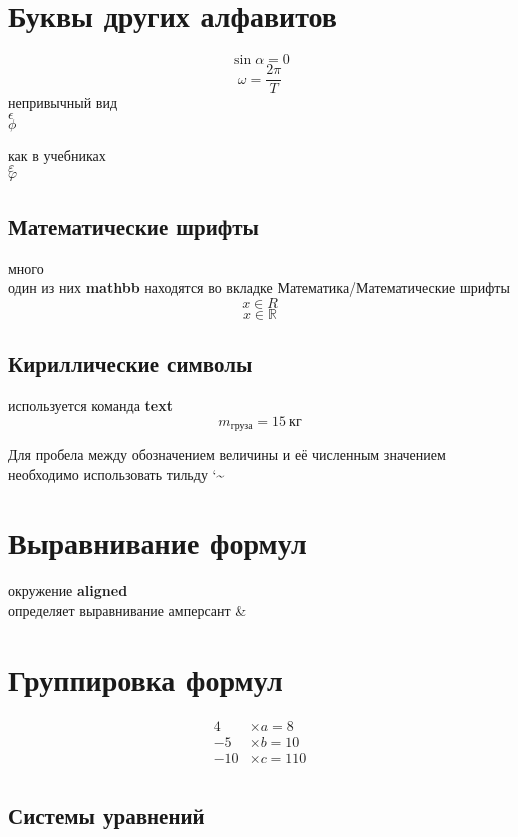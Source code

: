 \documentclass[12pt]{article}
\begin{document}
\section{Буквы других алфавитов}

\[ \sin \alpha = 0 \]
\[ \omega = \frac{2 \pi}{T} \]
непривычный вид\\
$\epsilon$\\
$\phi$

как в учебниках\\
$\varepsilon$\\
$\varphi$

\subsection{Математические шрифты}
много\\
один из них \textbf{mathbb}
находятся во вкладке Математика/Математические шрифты
\[ x \in R \]
\[ x \in \mathbb{R} \]

\subsection{Кириллические символы}
используется команда \textbf{text}
\[ m_{\text{груза}} = 15~\text{кг} \]

Для пробела между обозначением величины и её численным значением необходимо
использовать тильду \char`\~

\section{Выравнивание формул}
окружение \textbf{aligned}\\
определяет выравнивание амперсант \&

\section{Группировка формул}
\begin{equation}
  \begin{aligned}
    4 & \times a = 8 \\
    -5 & \times b = 10 \\
    -10 & \times c = 110 \\
  \end{aligned}
\end{equation}

\subsection{Системы уравнений}
\end{document}
